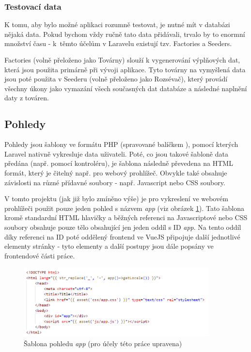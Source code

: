 		\subsubsection{Testovací data}
		K tomu, aby bylo možné aplikaci rozumně testovat, je nutné mít v databázi nějaká data. Pokud bychom vždy ručně tato data přidávali, trvalo by to enormní množství času - k~těmto účelům v Laravelu existují tzv. Factories a Seeders.
		
		Factories (volně přeloženo jako Továrny) slouží k vygenerování výplňových dat, která jsou použita primárně při vývoji aplikace. Tyto továrny na vymyšlená data jsou poté použita v Seederu (volně přeloženo jako Rozsévač), který provádí všechny úkony jako vymazání všech současných dat databáze a následné naplnění daty z továren.
	
	\subsection{Pohledy}
	Pohledy jsou šablony ve formátu PHP (spravované balíčkem ), pomocí kterých Laravel nativně vykresluje data uživateli. Poté, co jsou takové šabloně data předána (např. pomocí kontroléru), je šablona následně převedena na HTML formát, který je čitelný např. pro webový prohlížeč. Obvykle také obsahuje závislosti na různé přídavné soubory - např. Javascript nebo CSS soubory. 
	
	V tomto projektu (jak již bylo zmíněno výše) je pro vykreslení ve webovém prohlížeči použit pouze jeden pohled s názvem \textit{app} (viz obrázek \ref{fig:pohled_app}). Tato šablona kromě standardní HTML hlavičky a běžných referenci na Javascriptové nebo CSS soubory obsahuje pouze tělo obsahující jen jeden oddíl s ID \textit{app}. Na tento oddíl díky referenci na ID poté oddělený frontend ve VueJS připojuje další jednotlivé elementy stránky - tyto elementy a další postupy jsou dále popsány ve frontendové části práce.
	
	\begin{figure}[h]
		\centering
		\includegraphics[width=0.9\textwidth]{img/pohled_app.png}
		\caption{Šablona pohledu \textit{app} (pro účely této práce upravena)}
		\label{fig:pohled_app}
	\end{figure}
	
